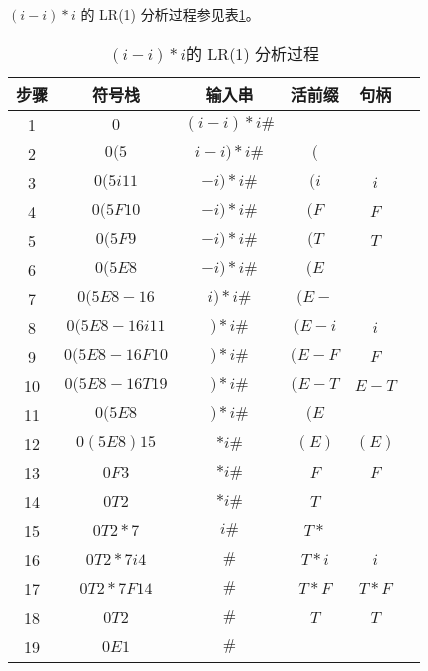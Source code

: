 \documentclass[UTF8]{ctexart}
\begin{document}
        $(i-i)* i$ 的 LR(1) 分析过程参见表\ref{pos}。
        \begin{table}[htbp!]
            \centering
            \begin{tabular}{|c|c|c|c|c|c|}
                \hline
                步骤 & 符号栈 & 输入串 & 活前缀 & 句柄 \\
                \hline
                \hline
                1 & $0$ & $(i-i)*i\#$ &  &   \\
                \hline
                2 & $0(5$ & $i-i)*i\#$ & $($  &   \\
                \hline
                3 & $0(5i11$ & $-i)*i\#$ & $(i$  & $i$ \\
                \hline
                4 & $0(5F10$ & $-i)*i\#$ & $(F$  & $F$ \\
                \hline
                5 & $0(5F9$ & $-i)*i\#$ & $(T$  & $T$ \\
                \hline
                6 & $0(5E8$ & $-i)*i\#$ & $(E$  & \\
                \hline
                7 & $0(5E8-16$ & $i)*i\#$ & $(E-$  & \\
                \hline
                8 & $0(5E8-16i11$ & $)*i\#$ & $(E-i$  & $i$ \\
                \hline
                9 & $0(5E8-16F10$ & $)*i\#$ & $(E-F$  & $F$\\
                \hline
                10 & $0(5E8-16T19$ & $)*i\#$ & $(E-T$  & $E-T$ \\
                \hline
                11 & $0(5E8$ & $)*i\#$ & $(E$  &  \\
                \hline
                12 & $0(5E8)15$ & $*i\#$ & $(E)$  & $(E)$ \\
                \hline
                13 & $0F3$ & $*i\#$ & $F$  & $F$ \\
                \hline
                14 & $0T2$ & $*i\#$ & $T$  & \\
                \hline
                15 & $0T2*7$ & $i\#$ & $T*$  & \\
                \hline
                16 & $0T2*7i4$ & $\#$ & $T*i$  & $i$ \\
                \hline
                17 & $0T2*7F14$ & $\#$ & $T*F$  & $T*F$ \\
                \hline
                18 & $0T2$ & $\#$ & $T$  & $T$ \\
                \hline
                19 & $0E1$ & $\#$ &  & \\
                \hline
                
            \end{tabular}
            \caption{$(i-i)* i$的 LR(1) 分析过程}
            \label{pos}
        \end{table}
\end{document}
